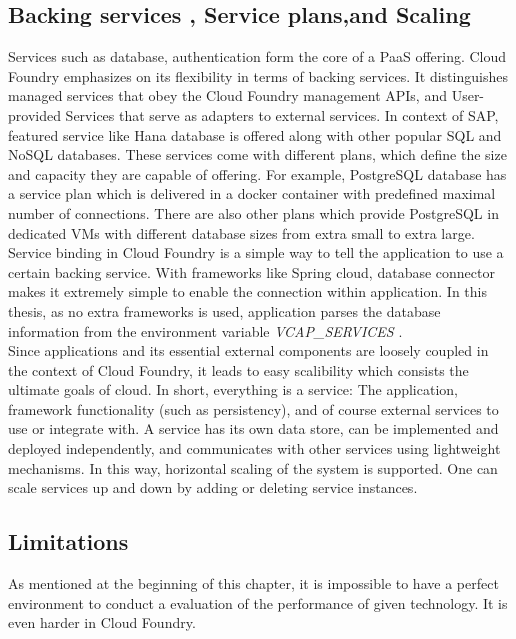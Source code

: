 \subsection{ Backing services , Service plans,and Scaling}
Services such as database, authentication form the core of a \ac{PaaS} offering. Cloud Foundry emphasizes on its flexibility in terms of backing services. It distinguishes managed services that obey the Cloud Foundry management APIs, and User-provided Services that serve as adapters to external services. In context of SAP, featured service like Hana database is offered along with other popular SQL and NoSQL databases. These services come with different plans, which define the size and capacity they are capable of offering. For example, PostgreSQL database has a service plan which is delivered in a docker container with predefined maximal number of connections. There are also other plans which provide PostgreSQL in dedicated VMs with different database sizes from extra small to extra large. \\
Service binding in Cloud Foundry is a simple way to tell the application to use a certain backing service. With frameworks like Spring cloud, database connector makes it extremely simple to enable the connection within application. In this thesis, as no extra frameworks is used, application parses the database information from the environment variable \textit{VCAP\_SERVICES} . \\
Since applications and its essential external components are loosely coupled in the context of Cloud Foundry, it leads to easy scalibility which consists the ultimate goals of cloud.  In short, everything is a service: The application, framework functionality (such as persistency), and of course external services to use or integrate with. A service has its own data store, can be implemented and deployed independently, and communicates with other services using lightweight mechanisms.  In this way, horizontal scaling of the system is supported. One can scale services up and down by adding or deleting service instances.

\subsection{Limitations}
As mentioned at the beginning of this chapter, it is impossible to have a perfect environment to conduct a evaluation of the performance of given technology. It is even harder in Cloud Foundry. \\

